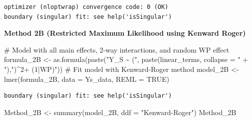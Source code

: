 \documentclass[
  letterpaper,
  DIV=11,
  numbers=noendperiod]{scrartcl}
\newenvironment{Shaded}{\begin{snugshade}}{\end{snugshade}}
\newcommand{\AttributeTok}[1]{\textcolor[rgb]{0.40,0.45,0.13}{#1}}
\newcommand{\CommentTok}[1]{\textcolor[rgb]{0.37,0.37,0.37}{#1}}
\newcommand{\ConstantTok}[1]{\textcolor[rgb]{0.56,0.35,0.01}{#1}}
\newcommand{\FunctionTok}[1]{\textcolor[rgb]{0.28,0.35,0.67}{#1}}
\newcommand{\NormalTok}[1]{\textcolor[rgb]{0.00,0.23,0.31}{#1}}
\newcommand{\OtherTok}[1]{\textcolor[rgb]{0.00,0.23,0.31}{#1}}
\newcommand{\StringTok}[1]{\textcolor[rgb]{0.13,0.47,0.30}{#1}}
\begin{document}
\begin{verbatim}
optimizer (nloptwrap) convergence code: 0 (OK)
boundary (singular) fit: see help('isSingular')
\end{verbatim}

\textbf{Method 2B (Restricted Maximum Likelihood using Kenward Roger)}

\begin{Shaded}
\begin{Highlighting}[]
\CommentTok{\# Model with all main effects, 2{-}way interactions, and random WP effect}
\NormalTok{formula\_2B }\OtherTok{\textless{}{-}} \FunctionTok{as.formula}\NormalTok{(}\FunctionTok{paste}\NormalTok{(}\StringTok{"Y\_S \textasciitilde{} ("}\NormalTok{, }
    \FunctionTok{paste}\NormalTok{(linear\_terms, }\AttributeTok{collapse =} \StringTok{" + "}\NormalTok{),}\StringTok{")\^{}2+ (1|WP)"}\NormalTok{))}
\CommentTok{\# Fit model with Kenward{-}Roger method}
\NormalTok{model\_2B }\OtherTok{\textless{}{-}} \FunctionTok{lmer}\NormalTok{(formula\_2B, }\AttributeTok{data =}\NormalTok{ Ys\_data, }\AttributeTok{REML =} \ConstantTok{TRUE}\NormalTok{)}
\end{Highlighting}
\end{Shaded}

\begin{verbatim}
boundary (singular) fit: see help('isSingular')
\end{verbatim}

\begin{Shaded}
\begin{Highlighting}[]
\NormalTok{Method\_2B }\OtherTok{\textless{}{-}} \FunctionTok{summary}\NormalTok{(model\_2B, }\AttributeTok{ddf =} \StringTok{"Kenward{-}Roger"}\NormalTok{)}
\NormalTok{Method\_2B}
\end{Highlighting}
\end{Shaded}
\end{document}
